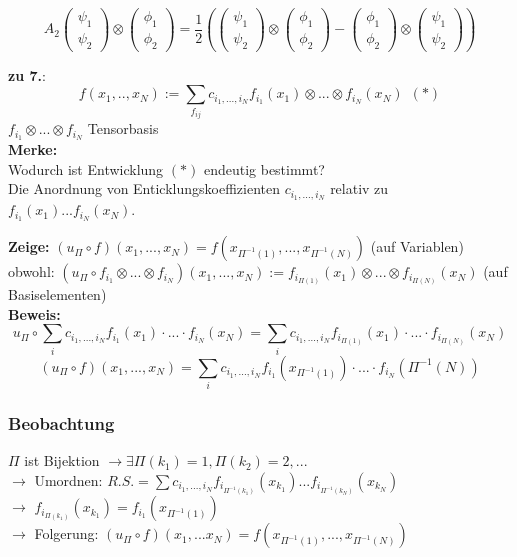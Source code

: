 \documentclass[twoside,a4paper]{scrartcl}
\renewcommand{\1}{\mathds{1}}
\newcommand{\ra}{\rightarrow}
\begin{document}
{$$A_2\begin{pmatrix} \psi_1 \\ \psi_2\end{pmatrix} \otimes \begin{pmatrix} \phi_1 \\ \phi_2\end{pmatrix}=\frac{1}{2} (\begin{pmatrix} \psi_1 \\ \psi_2\end{pmatrix}\otimes \begin{pmatrix} \phi_1 \\ \phi_2\end{pmatrix}-\begin{pmatrix} \phi_1 \\ \phi_2\end{pmatrix}\otimes \begin{pmatrix} \psi_1 \\ \psi_2\end{pmatrix})$$

\textbf{zu 7.}:\\
$$f(x_1,..,x_N):=\sum_{f_{ij}}c_{i_1,...,i_N} f_{i_1}(x_1) \otimes ...\otimes f_{i_N}(x_N) \ \ (*)$$
$f_{i_1} \otimes ...\otimes f_{i_N}$ Tensorbasis\\
\textbf{Merke:}\\
Wodurch ist Entwicklung $(*)$ endeutig bestimmt?\\
Die Anordnung von Enticklungskoeffizienten $c_{i_1,...,i_N}$ relativ zu $f_{i_1}(x_1)...f_{i_N}(x_N)$.

\textbf{Zeige:}
$(u_\Pi\circ f)(x_1,...,x_N)=f(x_{\Pi^{-1}(1)},...,x_{\Pi^{-1}(N)})$ (auf Variablen)\\
obwohl: $(u_\Pi\circ f_{i_1}\otimes...\otimes f_{i_N})(x_1,...,x_N):=f_{i_{\Pi(1)}}(x_1)\otimes...\otimes f_{i_{\Pi(N)}}(x_N)$ (auf Basiselementen)\\
\textbf{Beweis:}
$$u_\Pi \circ \sum_{i} c_{i_1,...,i_N}f_{i_1}(x_1)\cdot...\cdot f_{i_N}(x_N)=\sum_{i} c_{i_1,...,i_N}f_{i_{\Pi(1)}}(x_1)\cdot...\cdot f_{i_{\Pi(N)}}(x_N) $$
$$(u_\Pi \circ f)(x_1,...,x_N)=\sum_{i} c_{i_1,...,i_N}f_{i_1}(x_{\Pi^{-1}(1)})\cdot...\cdot f_{i_N}({\Pi^{-1}(N)})$$

\subsubsection*{Beobachtung}
$\Pi$ ist Bijektion $\ra \exists \Pi(k_1)=1,\Pi(k_2)=2,...$\\
$\ra$ Umordnen: $R.S.=\sum c_{i_1,...,i_N}f_{i_{\Pi^{-1}(k_1)}}(x_{k_1})...f_{i_{\Pi^{-1}(k_N)}}(x_{k_N})$ \\
$\ra$ $f_{i_{\Pi(k_1)}}(x_{k_1})=f_{i_1}(x_{\Pi^{-1}(1)})$\\
$\ra$ Folgerung: $(u_\Pi \circ f)(x_1, ... x_N)=f(x_{\Pi^{-1}(1)},...,x_{\Pi^{-1}(N)}) $
}{}
\end{document}
